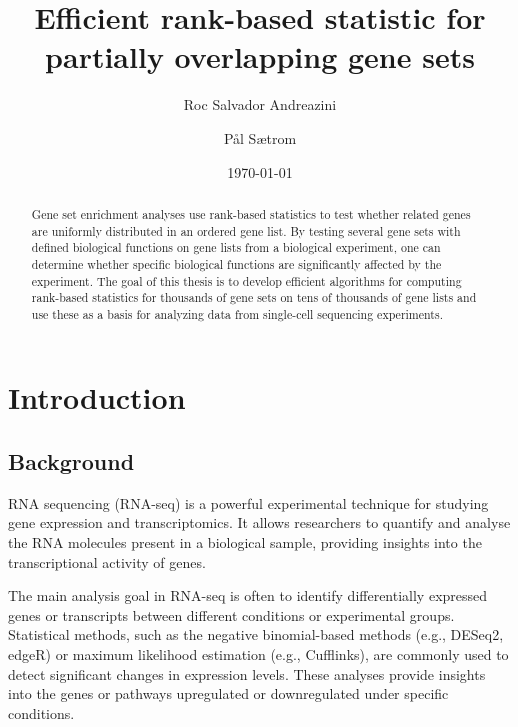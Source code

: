 \documentclass[aps,prb,twocolumn,superscriptaddress,floatfix,longbibliography]{revtex4-2}
\newif\ifptitle
\newif\ifpnumber
\newcounter{para}
\newcommand\ptitle[1]{\par\refstepcounter{para}
{\ifpnumber{\noindent\textcolor{lightgray}{\textbf{\thepara}}\indent}\fi}
{\ifptitle{\textbf{[{#1}]}}\fi}}
\newcommand{\mytitle}{Efficient rank-based statistic for partially overlapping gene sets}
\begin{document}
\title{\mytitle}

\author{Roc Salvador Andreazini}
\author{Pål Sætrom}


\date{\today}

\begin{abstract}
Gene set enrichment analyses use rank-based statistics to test whether related genes are uniformly distributed in an ordered gene list. By testing several gene sets with defined biological functions on gene lists from a biological experiment, one can determine whether specific biological functions are significantly affected by the experiment. The goal of this thesis is to develop efficient algorithms for computing rank-based statistics for thousands of gene sets on tens of thousands of gene lists and use these as a basis for analyzing data from single-cell sequencing experiments.
\end{abstract}

\maketitle
\section{\label{sec:Start}Introduction}

\subsection{Background}

\ptitle{RNA sequencing} RNA sequencing (RNA-seq) is a powerful experimental technique for studying gene expression and transcriptomics. It allows researchers to quantify and analyse the RNA molecules present in a biological sample, providing insights into the transcriptional activity of genes.

The main analysis goal in RNA-seq is often to identify differentially expressed genes or transcripts between different conditions or experimental groups. Statistical methods, such as the negative binomial-based methods (e.g., DESeq2, edgeR) or maximum likelihood estimation (e.g., Cufflinks), are commonly used to detect significant changes in expression levels. These analyses provide insights into the genes or pathways upregulated or downregulated under specific conditions.
\end{document}
